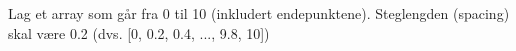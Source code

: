 %
%
Lag et array som går fra 0 til 10 (inkludert endepunktene). Steglengden (spacing) skal være 0.2  (dvs. [0, 0.2, 0.4, ..., 9.8, 10])
